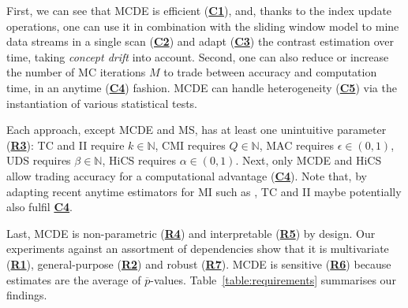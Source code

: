 First, we can see that \gls{MCDE} is efficient (\hyperlink{C1}{\textbf{C1}}), and, thanks to the index update operations, one can use it in combination with the sliding window model to mine data streams in a single scan (\hyperlink{C2}{\textbf{C2}}) and adapt (\hyperlink{C3}{\textbf{C3}}) the contrast estimation over time, taking \textit{concept drift} into account. 
Second, one can also reduce or increase the number of MC iterations $M$ to trade between accuracy and computation time, in an anytime (\hyperlink{C4}{\textbf{C4}}) fashion. \gls{MCDE} can handle heterogeneity (\hyperlink{C5}{\textbf{C5}})  via the instantiation of various statistical tests.

Each approach, except \gls{MCDE} and \gls{MS}, has at least one unintuitive parameter (\hyperlink{R3}{\textbf{R3}}): \gls{TC} and \gls{II} require $k \in \mathbb{N}$, \gls{CMI} requires $Q \in \mathbb{N}$, \gls{MAC} requires $\epsilon \in (0,1)$, \gls{UDS} requires $\beta \in \mathbb{N}$, \gls{HiCS} requires $\alpha \in (0,1)$. Next, only \gls{MCDE} and \gls{HiCS} allow trading accuracy for a computational advantage (\hyperlink{C4}{\textbf{C4}}). Note that, by adapting recent anytime estimators for \gls{MI} such as \cite{DBLP:conf/edbt/VollmerB19}, \gls{TC} and \gls{II} maybe potentially also fulfil \hyperlink{C4}{\textbf{C4}}. 

Last, \gls{MCDE} is non-parametric (\hyperlink{R4}{\textbf{R4}}) and interpretable (\hyperlink{R5}{\textbf{R5}}) by design. 
Our experiments against an assortment of dependencies show that it is multivariate (\hyperlink{R1}{\textbf{R1}}), general-purpose (\hyperlink{R2}{\textbf{R2}}) and robust (\hyperlink{R7}{\textbf{R7}}). \gls{MCDE} is sensitive (\hyperlink{R6}{\textbf{R6}}) because estimates are the average of $\overline{p}$-values. Table~\ref{table:requirements} summarises our findings.

